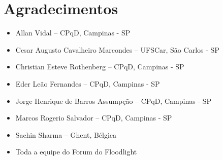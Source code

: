 \chapter{Agradecimentos}

\begin{itemize}
\item Allan Vidal -- CPqD, Campinas - SP
\item Cesar Augusto Cavalheiro Marcondes -- UFSCar, 
São Carlos - SP
\item Christian Esteve Rothenberg -- CPqD, Campinas - SP
\item Eder Leão Fernandes -- CPqD, Campinas - SP
\item Jorge Henrique de Barros Assumpção -- CPqD, Campinas - SP
\item Marcos Rogerio Salvador -- CPqD, Campinas - SP
\item Sachin Sharma -- Ghent, Bélgica
\item Toda a equipe do Forum do Floodlight
\end{itemize}
